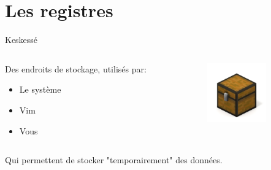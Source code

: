 \documentclass[10pt]{beamer}
\begin{document}
\section{Les registres}
	\begin{frame}{Keskessé}
		\begin{columns}[C]
			\begin{column}{0.50\textwidth}
				Des endroits de stockage, utilisés par:\\
				\begin{itemize}
					\item Le système
					\item Vim
					\item Vous
				\end{itemize}
			\end{column}
			\begin{column}{0.47\textwidth}
				\includegraphics[width=96]{img/chest.jpg}
			\end{column}
		\end{columns}

		\vspace{5pt}
		Qui permettent de stocker "temporairement" des données.
	\end{frame}
\end{document}
